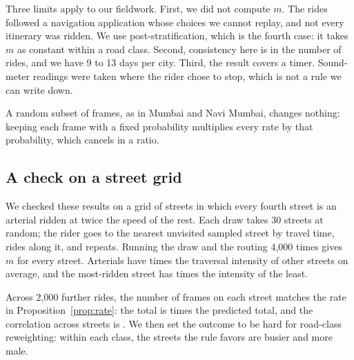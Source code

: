 \documentclass[11pt]{article}
\begin{document}
Three limits apply to our fieldwork. First, we did not compute $m$. The rides followed a navigation application whose choices we cannot replay, and not every itinerary was ridden. We use post-stratification, which is the fourth case: it takes $m$ as constant within a road class. Second, consistency here is in the number of rides, and we have 9 to 13 days per city. Third, the result covers a timer. Sound-meter readings were taken where the rider chose to stop, which is not a rule we can write down.

A random subset of frames, as in Mumbai and Navi Mumbai, changes nothing: keeping each frame with a fixed probability multiplies every rate by that probability, which cancels in a ratio.

\subsection{A check on a street grid}

We checked these results on a grid of \gridstreets{} streets in which every fourth street is an arterial ridden at twice the speed of the rest. Each draw takes 30 streets at random; the rider goes to the nearest unvisited sampled street by travel time, rides along it, and repeats. Running the draw and the routing 4,000 times gives $m$ for every street. Arterials have \gridintensityratio{} times the traversal intensity of other streets on average, and the most-ridden street has \gridintensityspread{} times the intensity of the least.

Across 2,000 further rides, the number of frames on each street matches the rate in Proposition~\ref{prop:rate}: the total is \gridframesratio{} times the predicted total, and the correlation across streets is \gridframescorrelation. We then set the outcome to be hard for road-class reweighting: within each class, the streets the rule favors are busier and more male.

\begin{table}[H]
\centering
\caption{Estimates of women's share of pedestrians on a simulated street grid where the true share is \gridtruth\% and, within each road class, streets the routing rule favors are more male. Each row summarizes 2,000 rides. Design weights divide each frame's speed by the street's traversal intensity, computed from 4,000 separate runs of the draw and the routing rule. Bias is the mean minus the truth; SD is the standard deviation of the estimates.}
\label{tab:grid}

\end{table}
\end{document}
